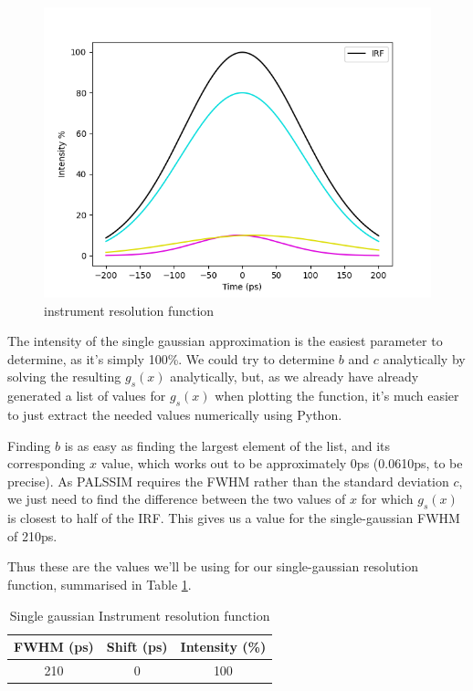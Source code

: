 \begin{figure}
    \centering
    \includegraphics[width=0.8\linewidth]{Batch 3/regular IRF/irf.png}
    \caption{instrument resolution function}
    \label{fig:irf}
\end{figure}

The intensity of the single gaussian approximation is the easiest parameter to determine, as it's simply 100\%. We could try to determine $b$ and $c$ analytically by solving the resulting $g_s(x)$ analytically, but, as we already have already generated a list of values for $g_s(x)$ when plotting the function, it's much easier to just extract the needed values numerically using Python.

Finding $b$ is as easy as finding the largest element of the list, and its corresponding $x$ value, which works out to be approximately 0ps (0.0610ps, to be precise). As PALSSIM requires the FWHM rather than the standard deviation $c$, we just need to find the difference between the two values of $x$ for which $g_s(x)$ is closest to half of the IRF. This gives us a value for the single-gaussian FWHM of 210ps.

Thus these are the values we'll be using for our single-gaussian resolution function, summarised in Table \ref{tab:irf-single}.

\begin{table}[h]
    \centering
    \begin{tabular}{|c|c|c|}
        \hline
        FWHM (ps) &  Shift (ps) & Intensity (\%) \\
        \hline
        210 & 0 & 100\\ 
        \hline
    \end{tabular}
    \caption{Single gaussian Instrument resolution function}
    \label{tab:irf-single}
\end{table}

